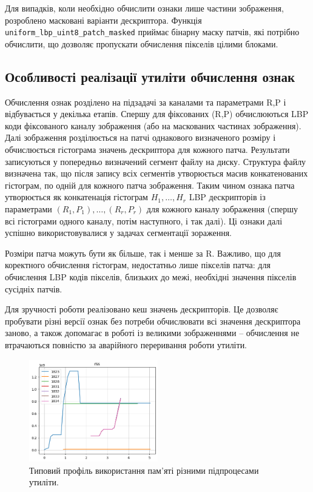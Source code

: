Для випадків, коли необхідно обчислити ознаки лише частини зображення, розроблено масковані варіанти дескриптора. 
Функція \verb|uniform_lbp_uint8_patch_masked| приймає бінарну маску патчів, які потрібно обчислити, що дозволяє пропускати обчислення пікселів цілими блоками. 

\subsection{Особливості реалізації утиліти обчислення ознак}\label{section2.2c}

Обчислення ознак розділено на підзадачі за каналами та параметрами R,P і відбувається у декілька етапів.
Спершу для фіксованих (R,P) обчислюються LBP коди фіксованого каналу зображення (або на маскованих частинах зображення).
Далі зображення розділюється на патчі однакового визначеного розміру і обчислюється гістограма значень дескриптора для кожного патча.
Результати записуються у попередньо визначений сегмент файлу на диску.
Структура файлу визначена так, що після запису всіх сегментів утворюється масив конкатенованих гістограм, по одній для кожного патча зображення.
Таким чином ознака патча утворюється як конкатенація гістограм $H_1,\dots ,H_r$ LBP дескрипторів із параметрами $(R_1,P_1),\dots ,(R_r,P_r)$ для кожного каналу зображення 
(спершу всі гістограми одного каналу, потім наступного, і так далі).
Ці ознаки далі успішно використовувалися у задачах сегментації зораження.

Розміри патча можуть бути як більше, так і менше за R.
Важливо, що для коректного обчислення гістограм, недостатньо лише пікселів патча: 
для обчислення LBP кодів пікселів, близьких до межі, необхідні значення пікселів сусідніх патчів.

Для зручності роботи реалізовано кеш значень дескрипторів. 
Це дозволяє пробувати різні версії ознак без потреби обчислювати всі значення дескриптора заново, 
а також допомагає в роботі із великими зображеннями -- обчислення не втрачаються повністю за аварійного переривання роботи утиліти.

\begin{figure}[h]
    \centering
    \includegraphics[width=0.5\textwidth]{img/fastlbp/memtest-1-rss.png}
    \caption{
        Типовий профіль використання пам'яті різними підпроцесами утиліти.
    }
    \label{fig:memprofile}
\end{figure}

